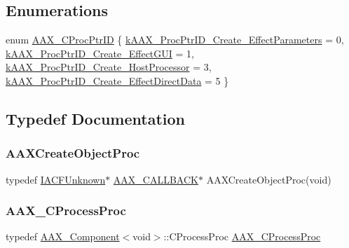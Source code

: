 \subsection*{Enumerations}
\begin{DoxyCompactItemize}
\item 
enum \mbox{\hyperlink{a00401_af0682195d377392ad356fd2b00c36892}{A\+A\+X\+\_\+\+C\+Proc\+Ptr\+ID}} \{ \mbox{\hyperlink{a00401_af0682195d377392ad356fd2b00c36892a86aab4af036f1087b4f31bbac234ac3d}{k\+A\+A\+X\+\_\+\+Proc\+Ptr\+I\+D\+\_\+\+Create\+\_\+\+Effect\+Parameters}} = 0, 
\mbox{\hyperlink{a00401_af0682195d377392ad356fd2b00c36892a102df0cf99f7423a7997dd283eed7a88}{k\+A\+A\+X\+\_\+\+Proc\+Ptr\+I\+D\+\_\+\+Create\+\_\+\+Effect\+G\+UI}} = 1, 
\mbox{\hyperlink{a00401_af0682195d377392ad356fd2b00c36892a04ce687ba05b8c7c2cce0b32d868f3db}{k\+A\+A\+X\+\_\+\+Proc\+Ptr\+I\+D\+\_\+\+Create\+\_\+\+Host\+Processor}} = 3, 
\mbox{\hyperlink{a00401_af0682195d377392ad356fd2b00c36892a2d3621474e9eeeda84309dad0a4d8d8e}{k\+A\+A\+X\+\_\+\+Proc\+Ptr\+I\+D\+\_\+\+Create\+\_\+\+Effect\+Direct\+Data}} = 5
 \}
\end{DoxyCompactItemize}


\subsection{Typedef Documentation}
\mbox{\label{a00401_ad02e57363d002e60ca822c728896a3c4}} 
\subsubsection{\texorpdfstring{AAXCreateObjectProc}{AAXCreateObjectProc}}
{\footnotesize\ttfamily typedef \mbox{\hyperlink{a01409}{I\+A\+C\+F\+Unknown}}$\ast$ \mbox{\hyperlink{a00392_aaa22112139aa627574b1ef562f579d43}{A\+A\+X\+\_\+\+C\+A\+L\+L\+B\+A\+CK}}$\ast$ A\+A\+X\+Create\+Object\+Proc(void)}

\mbox{\label{a00401_ad6dd5e1aa5bd2f8462966685e3b26a6e}} 
\subsubsection{\texorpdfstring{AAX\_CProcessProc}{AAX\_CProcessProc}}
{\footnotesize\ttfamily typedef \mbox{\hyperlink{a01437}{A\+A\+X\+\_\+\+Component}}$<$void$>$\+::C\+Process\+Proc \mbox{\hyperlink{a00401_ad6dd5e1aa5bd2f8462966685e3b26a6e}{A\+A\+X\+\_\+\+C\+Process\+Proc}}}



